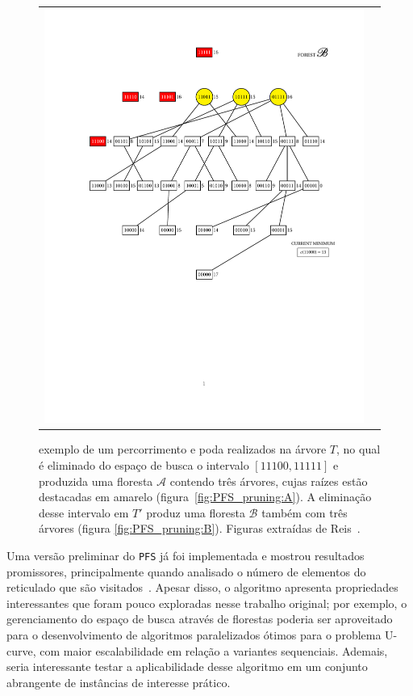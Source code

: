 \documentclass[12pt]{article}
\begin{document}
\begin{figure}[h]
\begin{tabular}{c c}
{{    \includegraphics[trim=3cm 8.5cm 1.2cm 2cm, clip=true]{PFS_dynamics_G.pdf}}
    \label{fig:PFS_pruning:B}  }
  \end{tabular}
  \caption{exemplo de um percorrimento e poda realizados na árvore $T$, no qual é eliminado 
do espaço de busca o intervalo $[11100, 11111]$ e produzida uma floresta $\mathcal{A}$ contendo três árvores, cujas raízes estão destacadas em amarelo
(figura~\ref{fig:PFS_pruning:A}). A eliminação desse intervalo em $T'$ produz
uma floresta $\mathcal{B}$ também com três árvores (figura \ref{fig:PFS_pruning:B}). Figuras extraídas
de Reis~\cite{msreis thesis}.}
  \label{fig:PFS_pruning} 
\end{figure}

Uma versão preliminar do {\tt PFS} já foi implementada e mostrou resultados promissores, principalmente
quando analisado o número de elementos do reticulado que são visitados~\cite{msreis thesis}. Apesar
disso, o algoritmo apresenta propriedades interessantes que foram pouco exploradas nesse trabalho original; por exemplo, o gerenciamento do espaço de busca através de florestas poderia ser aproveitado para o desenvolvimento de algoritmos paralelizados ótimos para o problema U-curve, com maior escalabilidade em relação a variantes sequenciais. Ademais, seria interessante testar a aplicabilidade desse algoritmo em um conjunto abrangente de instâncias de interesse prático.
\end{document}

